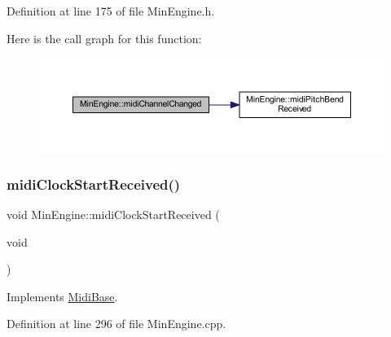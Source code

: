 Definition at line 175 of file Min\+Engine.\+h.

Here is the call graph for this function\+:
\nopagebreak
\begin{figure}[H]
\begin{center}
\leavevmode
\includegraphics[width=350pt]{class_min_engine_a5a88234cb86802788fd959d58efc9563_cgraph}
\end{center}
\end{figure}
\mbox{\label{class_min_engine_ad0378027f052b780481611fa4335b68d}} 
\subsubsection{\texorpdfstring{midi\+Clock\+Start\+Received()}{midiClockStartReceived()}}
{\footnotesize\ttfamily void Min\+Engine\+::midi\+Clock\+Start\+Received (\begin{DoxyParamCaption}\item[{void}]{ }\end{DoxyParamCaption})\hspace{0.3cm}{\ttfamily [virtual]}}



Implements \hyperlink{class_midi_base_aa368fed406eb62f900beb801e0552709}{Midi\+Base}.



Definition at line 296 of file Min\+Engine.\+cpp.

